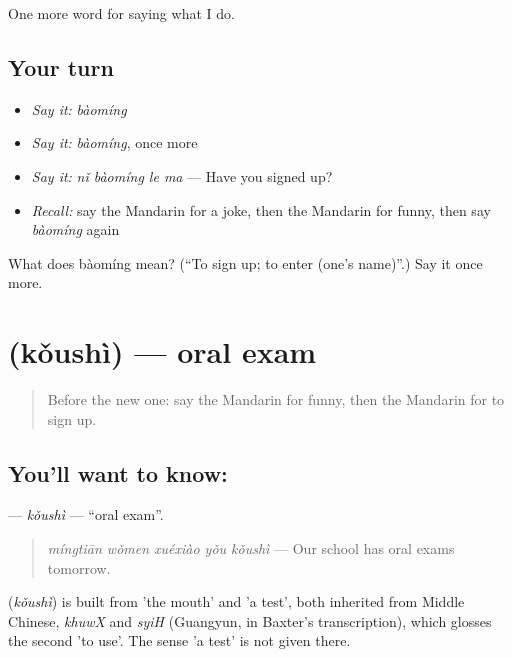 \begin{grammarlens}[title={What you've built}]
One more word for saying what I do.
\end{grammarlens}

\subsection*{Your turn}
\begin{itemize}
\raggedright
  \item \emph{Say it:} \emph{bàomíng}
  \item \emph{Say it:} \emph{bàomíng}, once more
  \item \emph{Say it:} \emph{nǐ bàomíng le ma} — Have you signed up?
  \item \emph{Recall:} say the Mandarin for a joke, then the Mandarin for funny, then say \emph{bàomíng} again
\end{itemize}

\begin{tcolorbox}[breakable,colback=teal!4,colframe=teal!35!black,title={Before you move on}]
What does bàomíng mean? (\textquotedblleft{}To sign up; to enter (one's name)\textquotedblright{}.) Say it once more.
\end{tcolorbox}
\section[\texorpdfstring{\zh{口试} (kǒushì)}{口试 (kǒushì)}]{ (kǒushì) — oral exam}

\label{lesson:ZH-C268-koushi}



\begin{quote}
Before the new one: say the Mandarin for funny, then the Mandarin for to sign up.
\end{quote}

\subsection*{You'll want to know: }
\textbf{} — \emph{kǒushì} — \textquotedblleft{}oral exam\textquotedblright{}.

\begin{quote}
\textbf{} \emph{míngtiān wǒmen xuéxiào yǒu kǒushì} — Our school has oral exams tomorrow.
\end{quote}

\begin{cousinweb}
\textbf{} (\emph{kǒushì}) is built from  'the mouth' and  'a test', both inherited from Middle Chinese, \emph{khuwX} and \emph{syiH} (Guangyun, in Baxter's transcription), which glosses the second 'to use'. The sense 'a test' is not given there.
\end{cousinweb}

